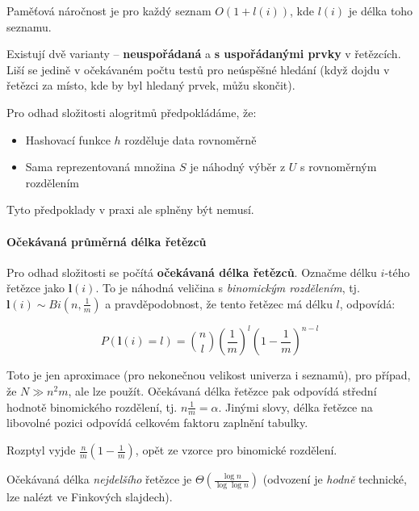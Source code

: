 \documentclass[11pt]{report} %
\numberwithin{equation}{section}
\begin{document}
Paměťová náročnost je pro každý seznam $O(1+l(i))$, kde $l(i)$ je délka toho seznamu.

Existují dvě varianty -- \textbf{neuspořádaná} a \textbf{s uspořádanými prvky} v řetězcích. Liší se jedině v očekávaném počtu testů pro neúspěšné hledání (když dojdu v řetězci za místo, kde by byl hledaný prvek, můžu skončit).

Pro odhad složitosti alogritmů předpokládáme, že:

\begin{itemize}
	\item Hashovací funkce $h$ rozděluje data rovnoměrně
	\item Sama reprezentovaná množina $S$ je náhodný výběr z $U$ s rovnoměrným rozdělením
\end{itemize}

Tyto předpoklady v praxi ale splněny být nemusí.

\paragraph{Očekávaná průměrná délka řetězců}

Pro odhad složitosti se počítá \textbf{očekávaná délka řetězců}. Označme délku $i$-tého řetězce jako $\mathbf{l}(i)$. To je náhodná veličina s \textit{binomickým rozdělením}, tj. $\mathbf{l}(i) \sim Bi(n,\frac{1}{m})$ a pravděpodobnost, že tento řetězec má délku $l$, odpovídá:

$$P(\mathbf{l}(i) = l) = \mathbf{}\binom{n}{l}\left(\frac{1}{m}\right)^{l}\left(1-\frac{1}{m}\right)^{n-l}$$

Toto je jen aproximace (pro nekonečnou velikost univerza i seznamů), pro případ, že $N\gg n^2 m$, ale lze použít. Očekávaná délka řetězce pak odpovídá střední hodnotě binomického rozdělení, tj. $n\frac{1}{m} = \alpha$. Jinými slovy, délka řetězce na libovolné pozici odpovídá celkovém faktoru zaplnění tabulky.

Rozptyl vyjde $\frac{n}{m}\left(1 - \frac{1}{m}\right)$, opět ze vzorce pro binomické rozdělení.

Očekávaná délka \textit{nejdelšího} řetězce je $\Theta(\frac{\log n}{\log\log n})$ (odvození je \textit{hodně} technické, lze nalézt ve Finkových slajdech).
\end{document}
